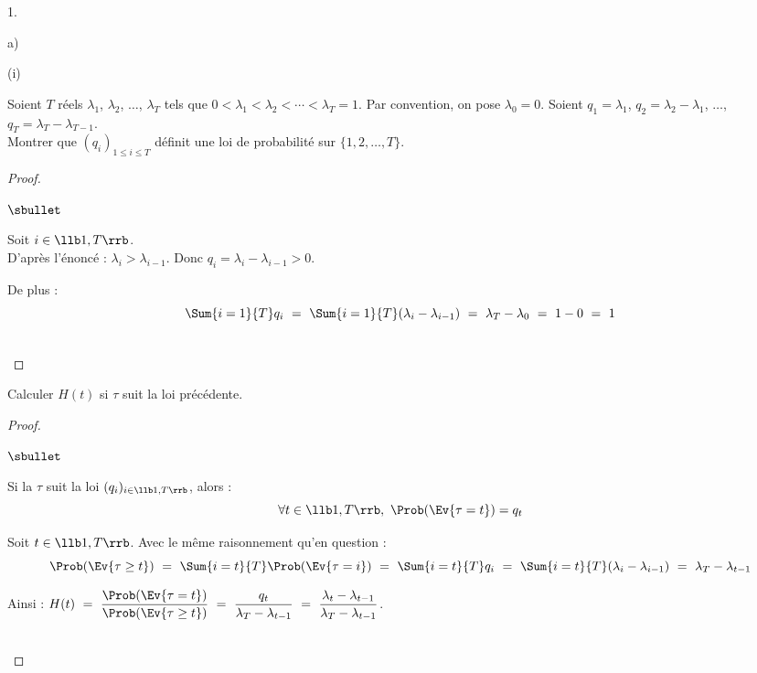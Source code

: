 \documentclass[11pt]{article}%
\begin{document}
\begin{noliste}{1.}
\begin{noliste}{a)}
    
    \item 
    \begin{nonoliste}{(i)}
      \item Soient $T$ réels $\lambda_1$, $\lambda_2$, $\ldots$, 
      $\lambda_T$ tels que $0 < \lambda_1 < \lambda_2 < \cdots < 
      \lambda_T=1$. Par convention, on pose $\lambda_0=0$. Soient 
      $q_1=\lambda_1$, $q_2=\lambda_2-\lambda_1$, $\ldots$, 
      $q_T=\lambda_T - \lambda_{T-1}$.\\
      Montrer que $(q_i)_{1\leq i \leq T}$ définit une loi de 
      probabilité sur $\{1,2, \ldots, T\}$.
      
      \begin{proof}~
        \begin{noliste}{$\sbullet$}
	  \item Soit $i\in \llb 1, T\rrb$.\\
	  D'après l'énoncé : $\lambda_i > \lambda_{i-1}$. Donc 
	  $q_i = \lambda_i - \lambda_{i-1} >0$.
	  
	  \item De plus :
	  \[
	    \Sum{i=1}{T} q_i \ = \ \Sum{i=1}{T} (\lambda_i - 
	    \lambda_{i-1}) \ = \ \lambda_T - \lambda_0 \ = \ 1-0
	    \ = \ 1
	  \]
        \end{noliste}
        ~\\[-1cm]
      \end{proof}

      
      \item Calculer $H(t)$ si $\tau$ suit la loi précédente.
      
      \begin{proof}~
        \begin{noliste}{$\sbullet$}
	  \item Si la \var $\tau$ suit la loi $(q_i)_{i \in \llb 1,T 
	  \rrb}$, alors :
	  \[
	    \forall t \in \llb 1,T \rrb, \ \Prob(\Ev{\tau =t}) = q_t
	  \]
	  
	  \item Soit $t\in \llb 1,T \rrb$.
	  Avec le même raisonnement qu'en question  :
	  \[
	    \Prob(\Ev{\tau \geq t}) \ = \ \Sum{i=t}{T} 
	    \Prob(\Ev{\tau =i}) \ = \ \Sum{i=t}{T} q_i \ = \
	    \Sum{i=t}{T} (\lambda_i - \lambda_{i-1}) \ = \ 
	    \lambda_T - \lambda_{t-1}
	  \]
	  
	  \item Ainsi : $H(t) \ = \ \dfrac{\Prob(\Ev{\tau =t})}
	  {\Prob(\Ev{\tau \geq t})} \ = \ \dfrac{q_t}{\lambda_T - 
	  \lambda_{t-1}} \ = \ \dfrac{\lambda_t - \lambda_{t-1}}
	  {\lambda_T - \lambda_{t-1}}$.
        \end{noliste}
        \conc{$\forall t \in \llb 1,T \rrb$, $H(t) \ = \ \dfrac{q_t}
        {\lambda_T - \lambda_{t-1}} \ = \ \dfrac{\lambda_t - 
        \lambda_{t-1}}{\lambda_T - \lambda_{t-1}}$}~\\[-1cm]
      \end{proof}
      

\end{nonoliste}
\end{noliste}
\end{noliste}
\end{document}
